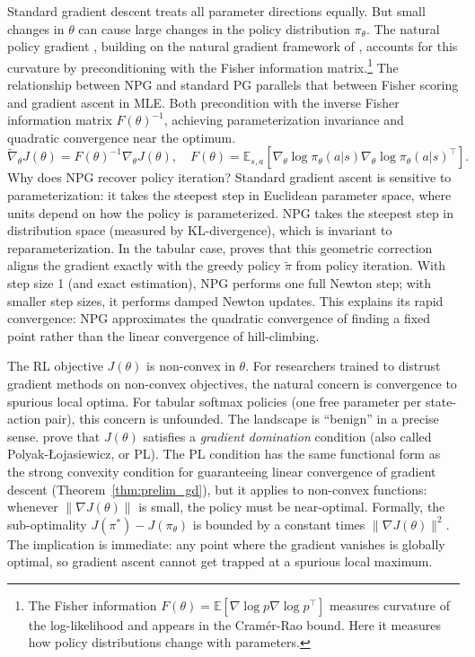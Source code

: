 Standard gradient descent treats all parameter directions equally. But small changes in $\theta$ can cause large changes in the policy distribution $\pi_\theta$. The natural policy gradient \citep{Kakade2001}, building on the natural gradient framework of \citet{amari1998natural}, accounts for this curvature by preconditioning with the Fisher information matrix.\footnote{The Fisher information $F(\theta) = \mathbb{E}[\nabla \log p \nabla \log p^\top]$ measures curvature of the log-likelihood and appears in the Cram\'er-Rao bound. Here it measures how policy distributions change with parameters.} The relationship between NPG and standard PG parallels that between Fisher scoring and gradient ascent in MLE. Both precondition with the inverse Fisher information matrix $F(\theta)^{-1}$, achieving parameterization invariance and quadratic convergence near the optimum.
\begin{equation}
\tilde{\nabla}_\theta J(\theta) = F(\theta)^{-1} \nabla_\theta J(\theta), \quad F(\theta) = \mathbb{E}_{s,a} \left[ \nabla_\theta \log \pi_\theta(a|s) \nabla_\theta \log \pi_\theta(a|s)^\top \right].
\label{eq:npg_fisher}
\end{equation}
Why does NPG recover policy iteration? Standard gradient ascent is sensitive to parameterization: it takes the steepest step in Euclidean parameter space, where units depend on how the policy is parameterized. NPG takes the steepest step in distribution space (measured by KL-divergence), which is invariant to reparameterization. In the tabular case, \citet[Theorem~2]{Kakade2001} proves that this geometric correction aligns the gradient exactly with the greedy policy $\tilde{\pi}$ from policy iteration. With step size 1 (and exact estimation), NPG performs one full Newton step; with smaller step sizes, it performs damped Newton updates. This explains its rapid convergence: NPG approximates the quadratic convergence of finding a fixed point rather than the linear convergence of hill-climbing.

The RL objective $J(\theta)$ is non-convex in $\theta$. For researchers trained to distrust gradient methods on non-convex objectives, the natural concern is convergence to spurious local optima. For tabular softmax policies (one free parameter per state-action pair), this concern is unfounded. The landscape is ``benign'' in a precise sense. \citet{agarwal2021theory} prove that $J(\theta)$ satisfies a \emph{gradient domination} condition (also called Polyak-\L{}ojasiewicz, or PL). The PL condition has the same functional form as the strong convexity condition for guaranteeing linear convergence of gradient descent (Theorem~\ref{thm:prelim_gd}), but it applies to non-convex functions: whenever $\|\nabla J(\theta)\|$ is small, the policy must be near-optimal. Formally, the sub-optimality $J(\pi^*) - J(\pi_\theta)$ is bounded by a constant times $\|\nabla J(\theta)\|^2$. The implication is immediate: any point where the gradient vanishes is globally optimal, so gradient ascent cannot get trapped at a spurious local maximum.

